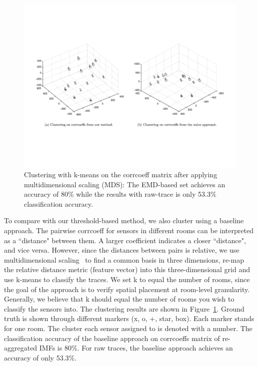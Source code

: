 \begin{figure}[ht!]
\centering
	\includegraphics[width=1.0\textwidth]{figs/Space_KmeanClustering}
\caption{Clustering with k-means on the corrcoeff matrix after applying multidimensional scaling (MDS): The EMD-based set achieves an accuracy of 80\% while the results with raw-trace is only 53.3\% classification accuracy.}
\label{fig:mds}
\end{figure}

To compare with our threshold-based method, we also cluster using a baseline approach. The pairwise corrcoeff for sensors in different rooms can be interpreted as a ``distance" between them.
A larger coefficient indicates a closer ``distance", and vice versa.  However, since the distances between pairs is relative, we use
multidimensional scaling~\cite{MDS} to find a common basis in three dimensions, re-map the relative distance metric (feature vector) into 
this three-dimensional grid and use k-means to classify the traces. %
We set k to equal the number of rooms, since the goal of the approach is to verify spatial placement at room-level granularity.  Generally, 
we believe that k should equal the number of rooms you wish to classify the sensors into. 
The clustering results are shown in Figure~\ref{fig:mds}.  Ground truth is shown through different markers (x, o, +, star, box). Each marker stands for one room. 
The cluster each sensor assigned to is denoted with a number. The classification accuracy of the baseline approach on corrcoeffs matrix of re-aggregated IMFs is 80\%. 
For raw traces, the baseline approach achieves an accuracy of only 53.3\%.





